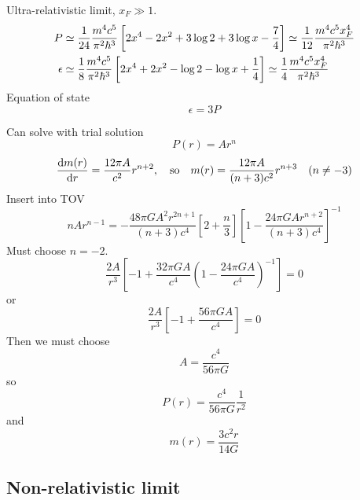 Ultra-relativistic limit, $x_F \gg 1$.
\begin{equation}
\begin{split}
	P        &\simeq \frac{1}{24} \frac{m^4 c^5}{\pi^2 \hbar^3} \left[ 2 x^{4} - 2 x^{2} + 3 \log 2 + 3 \log x - \frac{7}{4} \right] \simeq \frac{1}{12} \frac{m^4 c^5 x_F^4}{\pi^2 \hbar^3} \\
	\epsilon &\simeq \frac{1}{8}  \frac{m^4 c^5}{\pi^2 \hbar^3} \left[ 2 x^{4} + 2 x^{2} - \log 2 - \log x + \frac{1}{4} \right] \simeq \frac{1}{4} \frac{m^4 c^5 x_F^4}{\pi^2 \hbar^3} \\
\end{split}
\end{equation}
Equation of state
\begin{equation}
	\epsilon = 3 P
\end{equation}

Can solve with trial solution
\begin{equation}
	P(r) = A r^n
\end{equation}
\begin{equation}
	\odv{m(r)}{r} = \frac{12 \pi A}{c^2} r^{n+2},
	\quad \text{so} \quad
	m(r) = \frac{12 \pi A}{(n+3) c^2} r^{n+3}
	\quad (n \neq -3)
\end{equation}
Insert into TOV
\begin{equation}
	n A r^{n-1} =
	-\frac{48 \pi G A^2 r^{2n+1}}{(n+3) c^4} \left[ 2 + \frac{n}{3} \right] \left[ 1 - \frac{24 \pi G A r^{n+2}}{(n+3) c^4} \right]^{-1}
\end{equation}
Must choose $n = -2$.
\begin{equation}
	\frac{2 A}{r^3} \left[ -1 + \frac{32 \pi G A}{c^4} \left( 1 - \frac{24 \pi G A}{c^4} \right)^{-1} \right] = 0
\end{equation}
or
\begin{equation}
	\frac{2 A}{r^3} \left[ -1 + \frac{56 \pi G A}{c^4} \right] = 0
\end{equation}
Then we must choose
\begin{equation}
	A = \frac{c^4}{56 \pi G}
\end{equation}
so
\begin{equation}
	P(r) = \frac{c^4}{56 \pi G} \frac{1}{r^2}
\end{equation}
and
\begin{equation}
	m(r) = \frac{3 c^2 r}{14 G}
\end{equation}

\subsection{Non-relativistic limit}

